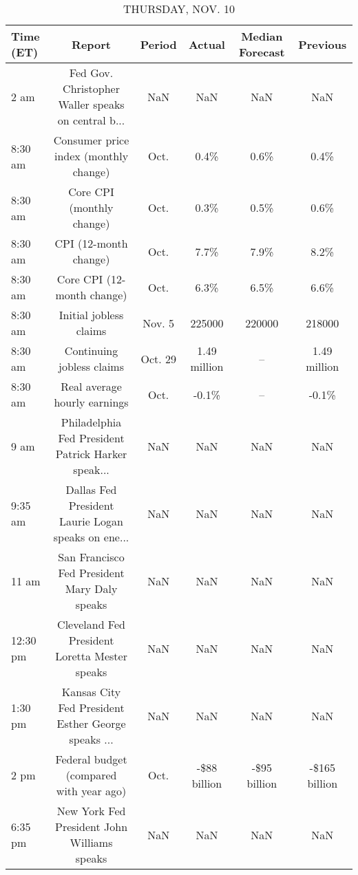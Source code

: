 \documentclass{article}%
\begin{document}
%


\begin{table}[htbp]%
\caption{THURSDAY, NOV. 10}%
\centering%
\begin{adjustbox}{width=1\textwidth}%
\begin{tabular}{lccccc}
\toprule
Time (ET) &                                             Report &  Period &       Actual & Median Forecast &      Previous \\
\midrule
     2 am & Fed Gov. Christopher Waller speaks on central b... &     NaN &          NaN &             NaN &           NaN \\
  8:30 am &              Consumer price index (monthly change) &    Oct. &         0.4\% &            0.6\% &          0.4\% \\
  8:30 am &                          Core CPI (monthly change) &    Oct. &         0.3\% &            0.5\% &          0.6\% \\
  8:30 am &                              CPI (12-month change) &    Oct. &         7.7\% &            7.9\% &          8.2\% \\
  8:30 am &                         Core CPI (12-month change) &    Oct. &         6.3\% &            6.5\% &          6.6\% \\
  8:30 am &                             Initial jobless claims &  Nov. 5 &       225000 &          220000 &        218000 \\
  8:30 am &                          Continuing jobless claims & Oct. 29 & 1.49 million &              -- &  1.49 million \\
  8:30 am &                       Real average hourly earnings &    Oct. &        -0.1\% &              -- &         -0.1\% \\
     9 am & Philadelphia Fed President Patrick Harker speak... &     NaN &          NaN &             NaN &           NaN \\
  9:35 am & Dallas Fed President Laurie Logan speaks on ene... &     NaN &          NaN &             NaN &           NaN \\
    11 am &       San Francisco Fed President Mary Daly speaks &     NaN &          NaN &             NaN &           NaN \\
 12:30 pm &      Cleveland Fed President Loretta Mester speaks &     NaN &          NaN &             NaN &           NaN \\
  1:30 pm & Kansas City Fed President Esther George speaks ... &     NaN &          NaN &             NaN &           NaN \\
     2 pm &            Federal budget (compared with year ago) &    Oct. & -\$88 billion &    -\$95 billion & -\$165 billion \\
  6:35 pm &        New York Fed President John Williams speaks &     NaN &          NaN &             NaN &           NaN \\
\bottomrule
\end{tabular}
%
\end{adjustbox}%
\end{table}
\end{document}
